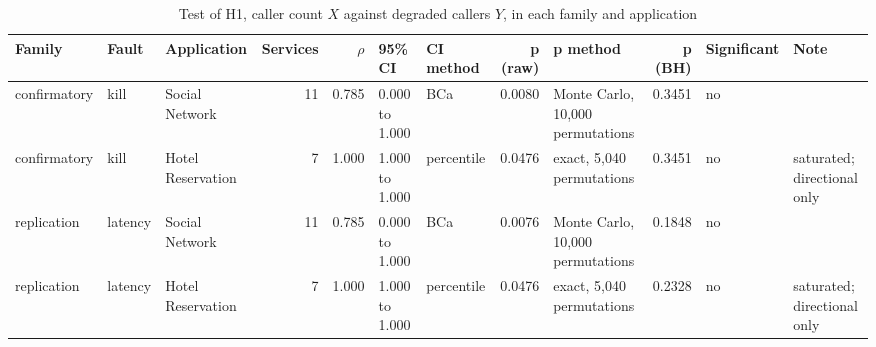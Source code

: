 \begin{table}[!t]
\centering
\caption{Test of H1, caller count $X$ against degraded callers $Y$, in each family and application}
\label{tab:tbl_ieee_primary}
\scriptsize
\setlength{\tabcolsep}{3pt}

\begin{tabular}{lllrrllrp{2.3cm}rlp{2.0cm}}
\toprule
\textbf{Family} & \textbf{Fault} & \textbf{Application} & \textbf{Services} & \textbf{$\rho$} & \textbf{95\% CI} & \textbf{CI method} & \textbf{p (raw)} & \textbf{p method} & \textbf{p (BH)} & \textbf{Significant} & \textbf{Note} \\
\midrule
confirmatory & kill & Social Network & 11 & 0.785 & 0.000 to 1.000 & BCa & 0.0080 & Monte Carlo, 10,000 permutations & 0.3451 & no &  \\
confirmatory & kill & Hotel Reservation & 7 & 1.000 & 1.000 to 1.000 & percentile & 0.0476 & exact, 5,040 permutations & 0.3451 & no & saturated; directional only \\
replication & latency & Social Network & 11 & 0.785 & 0.000 to 1.000 & BCa & 0.0076 & Monte Carlo, 10,000 permutations & 0.1848 & no &  \\
replication & latency & Hotel Reservation & 7 & 1.000 & 1.000 to 1.000 & percentile & 0.0476 & exact, 5,040 permutations & 0.2328 & no & saturated; directional only \\
\bottomrule
\end{tabular}
\end{table}
